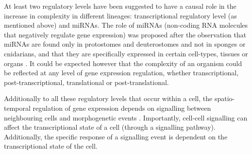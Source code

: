 At least two regulatory levels have been suggested to have a causal role in the increase in complexity in different lineages:  transcriptional regulatory level (as mentioned above) \citep{Davidson2001} and miRNAs. The role of miRNAs (non-coding RNA molecules that negatively regulate gene expression) was proposed after the observation that miRNAs are found only in protostomes and deuterostomes and not in sponges or cnidarians, and that they are specifically expressed in certain cell-types, tissues or organs \citep{Sempere2006}.
%
It could be expected however that the complexity of an organism could be reflected at any level of gene expression regulation, whether transcriptional, post-transcriptional, translational or post-translational.

Additionally to all these regulatory levels that occur within a cell, the spatio-temporal regulation of gene expression depends on signalling between neighbouring cells and morphogenetic events \citep{Gilbert2014}. Importantly, cell-cell signalling can affect the transcriptional state of a cell (through a signalling pathway). Additionally, the specific response of a signalling event is dependent on the transcriptional state of the cell.



